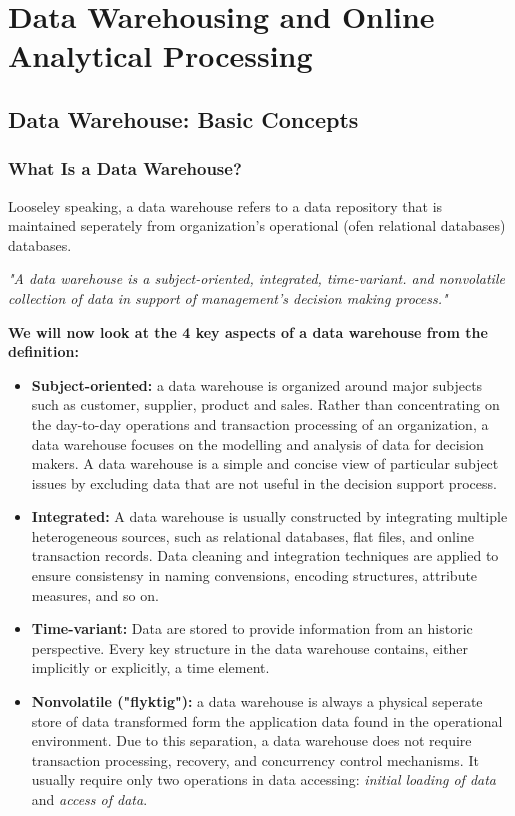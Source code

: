 \chapter{Data Warehousing and Online Analytical Processing}
\clearpage

\section{Data Warehouse: Basic Concepts}
	
	\subsection{What Is a Data Warehouse?}

		Looseley speaking, a data warehouse refers to a data repository that is maintained
		seperately from organization's operational (ofen relational databases) databases. 

		\vspace{0.5cm}
		{\it \Large "A data warehouse is a subject-oriented, integrated, time-variant. and
		nonvolatile collection of data in support of management's decision making process."}
		\vspace{0.5cm}

		{\bf We will now look at the 4 key aspects of a data warehouse from the definition:}
		\begin{itemize}
			\item {\bf Subject-oriented:} a data warehouse is organized around major subjects
			such as customer, supplier, product and sales. Rather than concentrating on the 
			day-to-day operations and transaction processing of an organization, a data warehouse
			focuses on the modelling and analysis of data for decision makers. A data warehouse
			is a simple and concise view of particular subject issues by excluding data that 
			are not useful in the decision support process.
			\item{\bf Integrated:} A data warehouse is usually constructed by integrating
			multiple heterogeneous sources, such as relational databases, flat files, and online
			transaction records. Data cleaning and integration techniques are applied to ensure
			consistensy in naming convensions, encoding structures, attribute measures, and so on.
			\item {\bf Time-variant:} Data are stored to provide information from an historic 
			perspective. Every key structure in the data warehouse contains, either implicitly or
			explicitly, a time element.
			\item{\bf Nonvolatile ("flyktig"):} a data warehouse is always a physical seperate
			store of data transformed form the application data found in the operational environment.
			Due to this separation, a data warehouse does not require transaction processing, 
			recovery, and concurrency control mechanisms. It usually require only two operations
			in data accessing: {\it initial loading of data} and {\it access of data}.
		\end{itemize}

